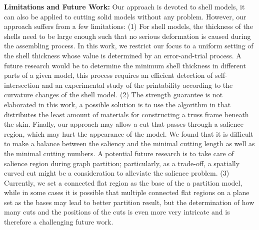 \textbf{Limitations and Future Work:} Our approach is devoted to shell models, it can also be applied to cutting solid models without any problem. However, our approach suffers from a few limitations: 
(1) For shell models, the thickness of the shells need to be large enough such that no serious deformation is caused during the assembling process. In this work, we restrict our focus to a uniform setting of the shell thickness whose value is determined by an error-and-trial process. A future research would be to determine the minimum shell thickness in different parts of a given model, this process requires an efficient detection of self-intersection and an experimental study of the printability according to the curvature changes of the shell model. 
(2) The strength guarantee is not elaborated in this work, a possible solution is to use the algorithm in \cite{WangWYLTTDCL13} that distributes the least amount of materials for constructing a truss frame beneath the skin. Finally, our approach may allow a cut that passes through a salience region, which may hurt the appearance of the model. We found that it is difficult to make a balance between the saliency and the minimal cutting length as well as the minimal cutting numbers. A potential future research is to take care of salience region during graph partition; particularly, as a trade-off, a spatially curved cut might be a consideration to alleviate the salience problem.
(3) Currently, we set a connected flat region as the base of the a partition model, while in some cases it is possible that multiple connected flat regions on a plane set as the bases may lead to better partition result, but the determination of how many cuts and the positions of the cuts is even more very intricate and is therefore a challenging future work.
